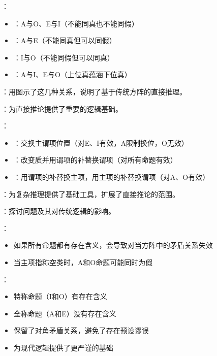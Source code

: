 {\begin{theorembox}[title=5.4 传统对当方阵]
：
\begin{itemize}
  \item {}：A与O、E与I（不能同真也不能同假）
  \item {}：A与E（不能同真但可以同假）
  \item {}：I与O（不能同假但可以同真）
  \item {}：A与I、E与O（上位真蕴涵下位真）
\end{itemize}

：用图示了这几种关系，说明了基于传统方阵的直接推理。

：为直接推论提供了重要的逻辑基础。
\end{theorembox}

\begin{theorembox}[title=5.5 其他直接推论方法]
：
\begin{itemize}
  \item {}：交换主谓项位置（对E、I有效，A限制换位，O无效）
  \item {}：改变质并用谓项的补替换谓项（对所有命题有效）
  \item {}：用谓项的补替换主项，用主项的补替换谓项（对A、O有效）
\end{itemize}

：为复杂推理提供了基础工具，扩展了直接推论的范围。
\end{theorembox}

\begin{theorembox}[title=5.6 存在含义与布尔解释]
：探讨问题及其对传统逻辑的影响。

：
\begin{itemize}
  \item 如果所有命题都有存在含义，会导致对当方阵中的矛盾关系失效
  \item 当主项指称空类时，A和O命题可能同时为假
\end{itemize}

：
\begin{itemize}
  \item 特称命题（I和O）有存在含义
  \item 全称命题（A和E）没有存在含义
  \item 保留了对角矛盾关系，避免了存在预设谬误
  \item 为现代逻辑提供了更严谨的基础
\end{itemize}
\end{theorembox}

}
